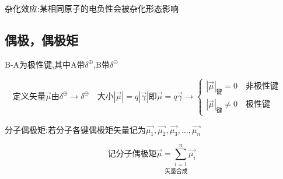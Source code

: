 杂化效应:某相同原子的电负性会被杂化形态影响

\subsection{偶极，偶极矩}
\label{sec:2.1.4}
\begin{figure}[H]
\end{figure}

B-A为极性键,其中A带$\delta^{\oplus}\text{,B带}\delta^{\ominus}$

$\quad\text{定义矢量}\vec{\mu}\text{由}\delta^{\oplus}\rightarrow\delta^{\ominus}
\quad\text{大小}\left| \vec{\mu} \right|=q\left| \vec{\gamma} \right|\text{即}\vec{\mu}=q\vec{\gamma}\rightarrow
\begin{cases}
    \left| \vec{\mu} \right|_{\text{键}}=0\quad\text{非极性键} \\
    \left| \vec{\mu} \right|_{\text{键}}\neq 0\quad\text{极性键}
\end{cases}$

\qquad\qquad\qquad {}

分子偶极矩:若分子各键偶极矩矢量记为$\vec{\mu_1},\vec{\mu_2},\vec{\mu_3},\dots,\vec{\mu_n}$

\begin{equation}
    \text{记分子偶极矩}
    \underset{\text{矢量合成}}{\vec{\mu}=\sum_{i=1}^{n} \vec{\mu_i}}
\end{equation}

